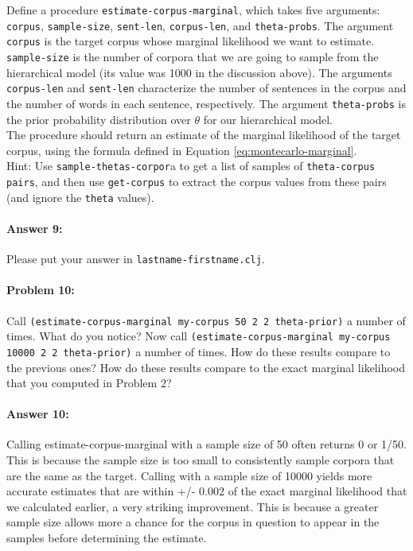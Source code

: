 \documentclass[10pt]{article}
\begin{document}
\noindent Define a procedure \texttt{estimate-corpus-marginal}, which
takes five arguments: \texttt{corpus}, \texttt{sample-size},
\texttt{sent-len}, \texttt{corpus-len}, and \texttt{theta-probs}. The
argument \texttt{corpus} is the target corpus whose marginal
likelihood we want to estimate. \texttt{sample-size} is the number of
corpora that we are going to sample from the hierarchical model (its
value was 1000 in the discussion above). The arguments
\texttt{corpus-len} and \texttt{sent-len} characterize the number of
sentences in the corpus and the number of words in each sentence,
respectively. The argument \texttt{theta-probs} is the prior
probability distribution over $\theta$ for our hierarchical model.
\\

\noindent The procedure should return an estimate of the marginal
likelihood of the target corpus, using the formula defined in Equation
\ref{eq:montecarlo-marginal}.
\\

\noindent Hint: Use \texttt{sample-thetas-corpor}a to get a list of
samples of \texttt{theta-corpus pairs}, and then use
\texttt{get-corpus} to extract the corpus values from these pairs (and
ignore the \texttt{theta} values).

\paragraph{Answer 9:} Please put your answer in
\texttt{lastname-firstname.clj}.

\hrulefill
\paragraph{Problem 10:} \noindent Call \texttt{(estimate-corpus-marginal my-corpus 50 2 2
  theta-prior)} a number of times. What do you notice? Now call
\texttt{(estimate-corpus-marginal my-corpus 10000 2 2 theta-prior)} a
number of times. How do these results compare to the previous ones?
How do these results compare to the exact marginal
likelihood that you computed in Problem 2?

\paragraph{Answer 10:} Calling estimate-corpus-marginal with a sample size of 50 often returns 0 or 1/50. This is because the sample size is too small to consistently sample corpora that are the same as the target. Calling with a sample size of 10000 yields more accurate estimates that are within +/- 0.002 of the exact marginal likelihood that we calculated earlier, a very striking improvement. This is because a greater sample size allows more a chance for the corpus in question to appear in the samples before determining the estimate.
\end{document}
